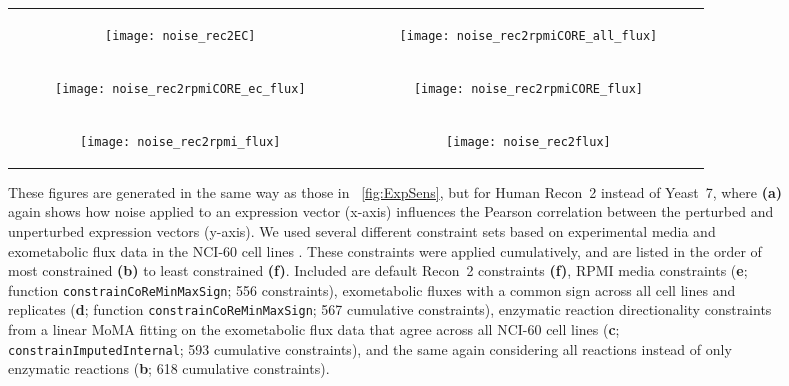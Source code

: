 \begin{figure}[!htb]
\begin{tabular}{cc}
  \begin{subfigure}[b]{0.5\textwidth}
  \texttt{[image: noise\_rec2EC]}
  \caption{} \label{fig:ExpSensRec2:A}
  \end{subfigure}
&
  \begin{subfigure}[b]{0.5\textwidth}
  \texttt{[image: noise\_rec2rpmiCORE\_all\_flux]}
  \caption{} \label{fig:ExpSensRec2:B}
  \end{subfigure} 
\\
  \begin{subfigure}[b]{0.5\textwidth}
  \texttt{[image: noise\_rec2rpmiCORE\_ec\_flux]}
  \caption{} \label{fig:ExpSensRec2:C}
  \end{subfigure} 
&
  \begin{subfigure}[b]{0.5\textwidth}
  \texttt{[image: noise\_rec2rpmiCORE\_flux]}
  \caption{} \label{fig:ExpSensRec2:D}
  \end{subfigure} 
\\
  \begin{subfigure}[b]{0.5\textwidth}
  \texttt{[image: noise\_rec2rpmi\_flux]}
  \caption{} \label{fig:ExpSensRec2:E}
  \end{subfigure} 
&
  \begin{subfigure}[b]{0.5\textwidth}
  \texttt{[image: noise\_rec2flux]}
  \caption{} \label{fig:ExpSensRec2:F}
  \end{subfigure} 
\\
\end{tabular}
\caption{ These figures are generated in the same way as those in
\Fig~\ref{fig:ExpSens}, but for Human Recon~2 instead of Yeast~7, where
\textbf{(a)} again shows how noise applied to an expression vector (x-axis)
influences the Pearson correlation between the perturbed and unperturbed
expression vectors (y-axis). We
used several different constraint sets based on experimental media and
exometabolic flux data in the NCI-60 cell lines \protect\citep{Jain2012}. 
These constraints were applied cumulatively, and are
listed in the order of most constrained \textbf{(b)} to least
constrained \textbf{(f)}. Included are default Recon~2 constraints
\textbf{(f)}, RPMI media constraints (\textbf{e}; function
\texttt{constrainCoReMinMaxSign}; 556 constraints), exometabolic
fluxes with a common sign across all cell lines and replicates
(\textbf{d}; function \texttt{constrainCoReMinMaxSign}; 567 cumulative
constraints), enzymatic reaction directionality constraints from a
linear MoMA fitting on the exometabolic flux data that agree across
all NCI-60 cell lines (\textbf{c};
\texttt{constrainImputed\-Internal}; 593 cumulative constraints), and
the same again considering all reactions instead of only enzymatic
reactions (\textbf{b}; 618 cumulative constraints).}
\label{fig:ExpSensRec2}
\end{figure}
\FloatBarrier

